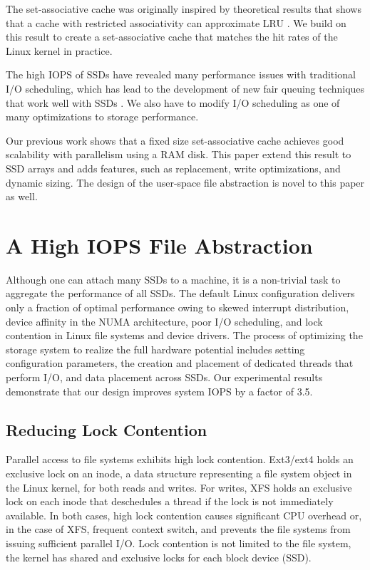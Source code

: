 The set-associative cache  was originally inspired by theoretical results 
that shows that a cache with restricted associativity can approximate LRU \cite{Sen02}.
We build on this result to create a set-associative cache that matches the 
hit rates of the Linux kernel in practice.

The high IOPS of SSDs have revealed many performance issues with 
traditional I/O scheduling, which has lead to the development of 
new fair queuing techniques that work well with SSDs \cite{Park12}.
We also have to modify I/O scheduling as one of many optimizations to 
storage performance.

Our previous work \cite{hotstorage12} shows that a fixed size set-associative cache
achieves good scalability with parallelism using a RAM disk.
This paper extend this result to SSD arrays and adds features, such as replacement,
write optimizations, and dynamic sizing.  The design of the user-space file abstraction
is novel to this paper as well.

\section{A High IOPS File Abstraction}

Although one can attach many SSDs to a machine, 
it is a non-trivial task to  aggregate the performance of all SSDs.
The default Linux configuration delivers only a fraction of optimal
performance owing to skewed interrupt distribution, device affinity
in the NUMA architecture, poor I/O scheduling, and lock contention
in Linux file systems and device drivers.
The process of optimizing the storage system to realize the 
full hardware potential includes setting configuration parameters,
the creation and placement of dedicated threads that perform I/O,
and data placement across SSDs.  
Our experimental results demonstrate that our design
improves system IOPS by a factor of 3.5.

\subsection{Reducing Lock Contention}

Parallel access to file systems exhibits high lock contention. 
Ext3/ext4 holds an exclusive lock on an inode, a data structure
representing a file system object in the Linux kernel, for both reads and
writes.  For writes, XFS holds an exclusive lock on each inode that 
deschedules a thread if the lock is not immediately available. 
In both cases, high lock contention causes significant CPU overhead or,
in the case of XFS, frequent context switch, and prevents the file systems
from issuing sufficient parallel I/O.
Lock contention is not limited to the file system, the kernel has
shared and exclusive locks for each block device (SSD).

